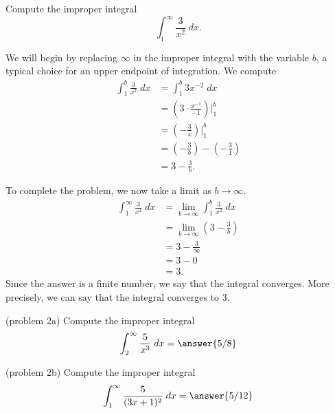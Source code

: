 \documentclass{ximera}
\begin{document}
\begin{example}[example 2]
Compute the improper integral
\[
\int_1^\infty \frac{3}{x^2} \; dx.
\]

We will begin by replacing $\infty$ in the improper integral with the variable $b$, a typical choice for an upper endpoint of integration.
We compute
\begin{align*}
\int_1^b \frac{3}{x^2} \; dx &= \int_1^b 3x^{-2} \; dx\\
                           &= \left(3\cdot \frac{x^{-1}}{-1} \right) \bigg|_1^b\\
                           &= \left(-\frac{3}{x} \right) \bigg|_1^b\\
                       &= \left(-\frac{3}{b} \right) - \left(-\frac{3}{1} \right)\\
                       &=3 - \frac{3}{b}.
\end{align*}
                       
To complete the problem, we now take a limit as $b \to \infty$.
\begin{align*}
\int_1^\infty \frac{3}{x^2} \; dx &= \lim_{b \to \infty}\int_1^b \frac{3}{x^2} \; dx\\
                       &=\lim_{b \to \infty} \left(3 - \frac{3}{b}\right)\\
                       &= 3 -\frac{3}{\infty}\\
                       &= 3 - 0 \\
                       &= 3.
\end{align*}
Since the answer is a finite number, we say that the integral converges.
More precisely, we can say that the integral converges to $3$.

\end{example}



\begin{problem}(problem 2a)
Compute the improper integral
\[
\int_2^\infty \frac{5}{x^3} \; dx = \answer{5/8} 
\]
\begin{multipleChoice}
\end{multipleChoice}
\end{problem}


\begin{problem}(problem 2b)
Compute the improper integral
\[
\int_1^\infty \frac{5}{(3x+1)^2} \; dx = \answer{5/12}
\]
\begin{multipleChoice}
\end{multipleChoice}
\end{problem}
\end{document}
